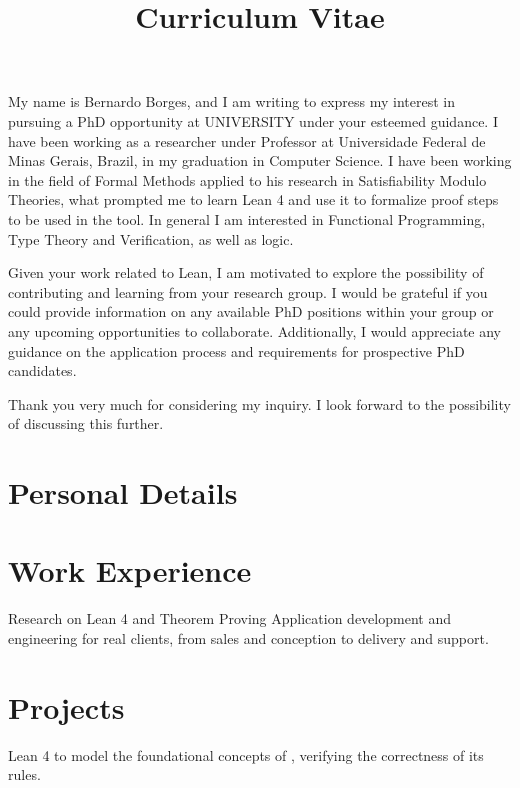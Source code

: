 \documentclass[a4paper]{moderncv}
\title{Curriculum Vitae}
\begin{document}
\makelettertitle
My name is Bernardo Borges, and I am writing to express my interest in pursuing a PhD opportunity at
UNIVERSITY under your esteemed guidance.
I have been working as a researcher under Professor 
at Universidade Federal de Minas Gerais, Brazil, in my graduation in Computer Science.
I have been working in the field of Formal Methods applied to his research in Satisfiability Modulo
Theories, what prompted me to learn Lean 4 and use it to formalize proof steps to be used in the
 tool.
In general I am interested in Functional Programming, Type Theory and Verification, as well as logic.

Given your work related to Lean, I am motivated to explore the possibility of contributing and learning
from your research group. I would be grateful if you could provide information on any available PhD
positions within your group or any upcoming opportunities to collaborate.
Additionally, I would appreciate any guidance on the application process and requirements for
prospective PhD candidates.

Thank you very much for considering my inquiry. I look forward to the possibility of discussing
this further.

\makeletterclosing

\newpage

\maketitle
\section{Personal Details}

\section{Work Experience}
{Research on Lean 4 and Theorem Proving}
{Application development and engineering for real clients, from sales and conception to delivery and support.}

\section{Projects}
{Lean 4  to model the
    foundational concepts of ,
    verifying the correctness of its rules.}
\end{document}

